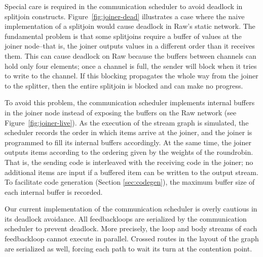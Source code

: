 % 

Special care is required in the communication scheduler to avoid
deadlock in splitjoin constructs.  Figure~\ref{fig:joiner-dead}
illustrates a case where the naive implementation of a splitjoin would
cause deadlock in Raw's static network.  The fundamental problem is
that some splitjoins require a buffer of values at the joiner
node--that is, the joiner outputs values in a different order than it
receives them.  This can cause deadlock on Raw because the buffers
between channels can hold only four elements; once a channel is full,
the sender will block when it tries to write to the channel.  If this
blocking propagates the whole way from the joiner to the splitter,
then the entire splitjoin is blocked and can make no progress.

To avoid this problem, the communication scheduler implements internal
buffers in the joiner node instead of exposing the buffers on the Raw
network (see Figure~\ref{fig:joiner-live}).  As the execution of the
stream graph is simulated, the scheduler records the order in which
items arrive at the joiner, and the joiner is programmed to fill its
internal buffers accordingly.  At the same time, the joiner outputs
items according to the ordering given by the weights of the
roundrobin.  That is, the sending code is interleaved with the
receiving code in the joiner; no additional items are input if a
buffered item can be written to the output stream.  To facilitate code
generation (Section \ref{sec:codegen}), the maximum buffer size of
each internal buffer is recorded.

Our current implementation of the communication scheduler is overly
cautious in its deadlock avoidance.  All feedbackloops are serialized
by the communication scheduler to prevent deadlock.  More precisely,
the loop and body streams of each feedbackloop cannot execute in
parallel.  Crossed routes in the layout of the graph are serialized as
well, forcing each path to wait its turn at the contention point.
